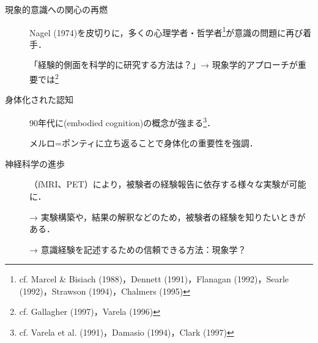 \documentclass[b5j, 9pt]{ltjsarticle}
\begin{document}
\begin{description}
  \item[現象的意識への関心の再燃] Nagel (1974)を皮切りに，多くの心理学者・哲学者\footnote{
    cf. Marcel \& Bisiach (1988)，Dennett (1991)，Flanagan (1992)，Searle (1992)，Strawson (1994)，Chalmers (1995)
  }が意識の問題に再び着手．\par
  「経験的側面を科学的に研究する方法は？」→ 現象学的アプローチが重要では\footnote{
    cf. Gallagher (1997)，Varela (1996)
  }
  \item[身体化された認知] 90年代に(embodied cognition)の概念が強まる\footnote{
    cf. Varela et al. (1991)，Damasio (1994)，Clark (1997)
  }．\par
  メルロ=ポンティに立ち返ることで身体化の重要性を強調．\par
  \item[神経科学の進歩] （fMRI、PET）により，被験者の経験報告に依存する様々な実験が可能に．\par
  → 実験構築や，結果の解釈などのため，被験者の経験を知りたいときがある．\par
  → 意識経験を記述するための信頼できる方法：現象学？
\end{description}
\end{document}
